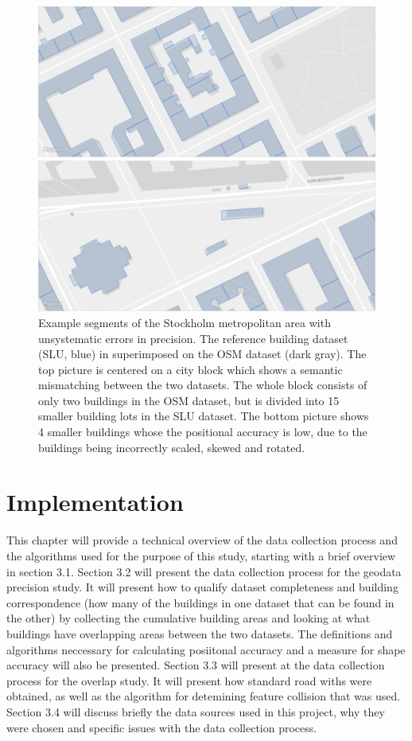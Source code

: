 \documentclass{kththesis}
\begin{document}
\begin{figure}[H]
    \centering
    \includegraphics[width=\textwidth,height=0.5\textheight,keepaspectratio]{img_map_compare}
    \caption{Example segments of the Stockholm metropolitan area with unsystematic errors in precision. The reference building dataset (SLU, blue) in superimposed on the OSM dataset (dark gray). The top picture is centered on a city block which shows a semantic mismatching between the two datasets. The whole block consists of only two buildings in the OSM dataset, but is divided into 15 smaller building lots in the SLU dataset. The bottom picture shows 4 smaller buildings whose the positional accuracy is low, due to the buildings being incorrectly scaled, skewed and rotated.}
    \label{fig:osm-slu-map}
\end{figure}

\chapter{Implementation}

This chapter will provide a technical overview of the data collection process and the algorithms used for the purpose of this study, starting with a brief overview in section 3.1.
Section 3.2 will present the data collection process for the geodata precision study. It will present how to qualify dataset completeness and building correspondence (how many of the buildings in one dataset that can be found in the other) by collecting the cumulative building areas and looking at what buildings have overlapping areas between the two datasets.
The definitions and algorithms neccessary for calculating posiitonal accuracy and a measure for shape accuracy will also be presented.
Section 3.3 will present at the data collection process for the overlap study. It will present how standard road withs were obtained, as well as the algorithm for detemining feature collision that was used.
Section 3.4 will discuss briefly the data sources used in this project, why they were chosen and specific issues with the data collection process.
\end{document}
